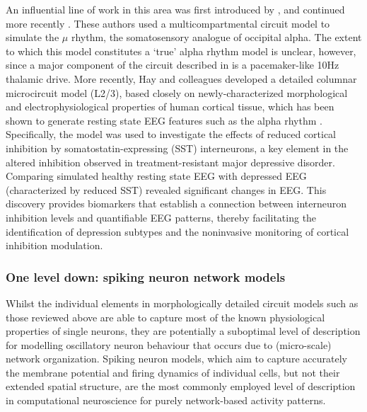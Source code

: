 \documentclass[12pt,twoside]{article}
\begin{document}

An influential line of work in this area was first introduced by \citet{jones2009quantitative}, and continued more recently \citep{neymotin2020human,studenova2022non}. These authors used a multicompartmental circuit model to simulate the $\mu$ rhythm, the somatosensory analogue of occipital alpha. The extent to which this model constitutes a `true' alpha rhythm model is unclear, however, since a major component of the circuit described in \citet{jones2009quantitative} is a pacemaker-like 10Hz thalamic drive. More recently, Hay and colleagues developed a detailed columnar microcircuit model (L2/3), based closely on newly-characterized morphological and electrophysiological properties of human cortical tissue, which has been shown to generate resting state EEG features such as the alpha rhythm \citep{yao2022reduced, mazza2022eeg}. Specifically, the model was used to investigate the effects of reduced cortical inhibition by somatostatin-expressing (SST) interneurons, a key element in the altered inhibition observed in treatment-resistant major depressive disorder. Comparing simulated healthy resting state EEG with depressed EEG (characterized by reduced SST) revealed significant changes in EEG. This discovery provides biomarkers that establish a connection between interneuron inhibition levels and quantifiable EEG patterns, thereby facilitating the identification of depression subtypes and the noninvasive monitoring of cortical inhibition modulation.



\subsubsection{One level down: spiking neuron network models}
Whilst the individual elements in morphologically detailed circuit models such as those reviewed above are able to capture most of the known physiological properties of single neurons, they are potentially a suboptimal level of description for modelling oscillatory neuron behaviour that occurs due to (micro-scale) network organization. Spiking neuron models, which aim to capture accurately the membrane potential and firing dynamics of individual cells, but not their extended spatial structure, are the most commonly employed level of description in computational neuroscience for purely network-based activity patterns. 
\end{document}
